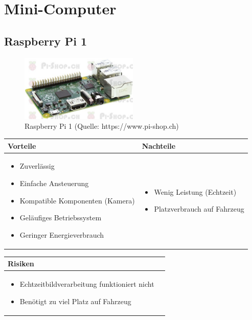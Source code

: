 
\section{Mini-Computer}


\subsection{Raspberry Pi 1}

\begin{figure}[h!]%
\centering
\includegraphics[width=0.5\textwidth]{fig/PI1.jpg}
\caption{Raspberry Pi 1 (Quelle: https://www.pi-shop.ch)}
\label{fig:PI1}
\end{figure}

\begin{table}[h]
\begin{tabular}{p{} | p{}}


 \textbf{Vorteile} & \textbf{Nachteile} \\ \hline
	 
\begin{itemize}
\item Zuverlässig
\item Einfache Ansteuerung
\item Kompatible Komponenten (Kamera)
\item Geläufiges Betriebssystem
\item Geringer Energieverbrauch
\end{itemize}

 
 &
 
\begin{itemize}
\item Wenig Leistung (Echtzeit)
\item Platzverbrauch auf Fahrzeug
\end{itemize}

\end{tabular}
\end{table}

\begin{table}[h]
\begin{tabular}{p{}p{}}


 \textbf{Risiken} & \\ \hline
	 
\begin{itemize}
\item Echtzeitbildverarbeitung funktioniert nicht
\item Benötigt zu viel Platz auf Fahrzeug
\end{itemize}

 
\end{tabular}
\end{table}

